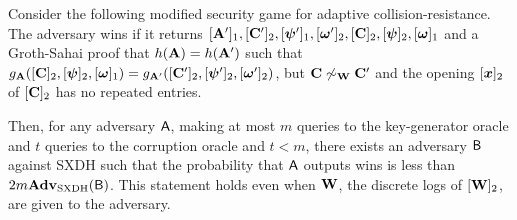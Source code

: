  \begin{lemma} \label{lemma:g-crp-sxdh} Consider the following modified security game for adaptive collision-resistance. The adversary wins if it returns $[\mathbf{{A}}']_1,[\mathbf{{C}}']_2,[{\boldsymbol{\psi}}']_1,[{\boldsymbol{\omega}}']_2,[\mathbf{{C}}]_2,[{\boldsymbol{\psi}}]_2,[{\boldsymbol{\omega}}]_1$ and a Groth-Sahai proof that  $h(\mathbf{{A}})=h(\mathbf{{A}}')$ such that $g_{\mathbf{{A}}}([\mathbf{{C}}]_2,[{\boldsymbol{\psi}}]_2,[{\boldsymbol{\omega}}]_1) = g_{\mathbf{{A}}'}([\mathbf{{C}}']_2,\allowbreak[{\boldsymbol{\psi}}']_2,[{\boldsymbol{\omega}}']_2)$, but  $\mathbf{{C}}\not\sim_{\mathbf{{W}}}\mathbf{{C}}'$ and the opening $[{\boldsymbol{x}}]_2$ of $[\mathbf{{C}}]_2$ has no repeated entries.

Then, for any adversary $\mathsf{A}$, making at most $m$  queries to the key-generator oracle and $t$ queries to the corruption oracle and $t<m$, there exists an adversary $\mathsf{B}$ against SXDH such that the probability that $\mathsf{A}$ outputs wins is less than $2m \mathbf{Adv}_{\mathrm{SXDH}}(\mathsf{B})$. This statement holds even when $\mathbf{{W}}$, the discrete logs of $[\mathbf{{W}}]_2$, are given to the adversary.
\end{lemma}
